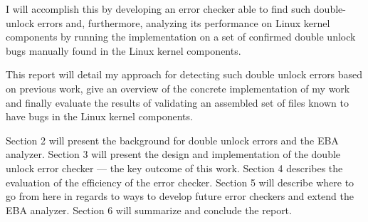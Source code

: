 \newpar I will accomplish this by developing an error checker able to find such double-unlock errors and, furthermore, analyzing its performance on Linux kernel components by running the implementation on a set of confirmed double unlock bugs manually found in the Linux kernel components.

\newpar This report will detail my approach for detecting such double unlock errors based on previous work, give an overview of the concrete implementation of my work and finally evaluate the results of validating an assembled set of files known to have bugs in the Linux kernel components.

\newpar Section 2 will present the background for double unlock errors and the EBA analyzer. Section 3 will present the design and implementation of the double unlock error checker --- the key outcome of this work. Section 4 describes the evaluation of the efficiency of the error checker. Section 5 will describe where to go from here in regards to ways to develop future error checkers and extend the EBA analyzer. Section 6 will summarize and conclude the report.
